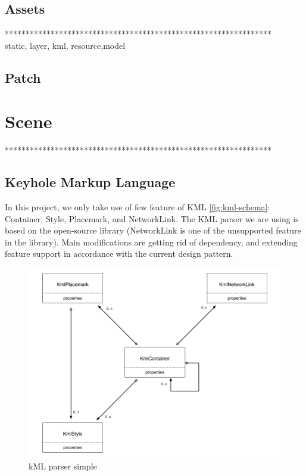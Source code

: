 \subsection{Assets}

****************************************************************\\%
static, layer, kml, resource,model\\

\subsection{Patch}

\section{Scene}

****************************************************************\\%

\subsection{Keyhole Markup Language}

In this project, we only take use of few feature of KML \ref{fig:kml-schema}: Container, Style, Placemark,  and NetworkLink. The KML parser we are using is based on the open-source library  \parencite{Google.code-kml.2016} (NetworkLink is one of the unsupported feature in the library). Main modifications are getting rid of  dependency, and extending  feature support in accordance with the current design pattern.

\begin{figure}[H]
\caption[kml-parser-simple]{kML parser simple}
\label{fig:kml-parser-simple}
\centering
\includegraphics[width=\linewidth]{Figures/kml-parser-simple.png}
\decoRule
\end{figure}

